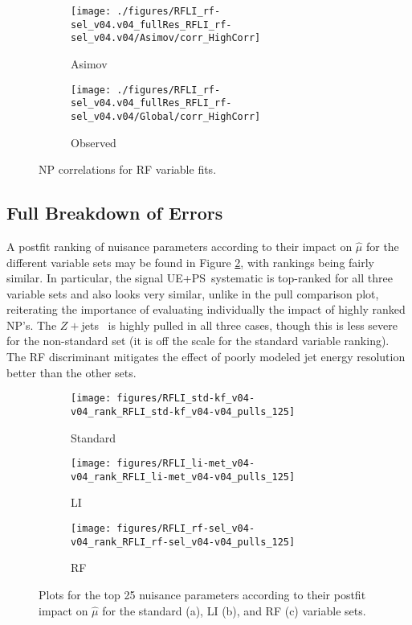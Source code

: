 \begin{figure}[!htbp]\captionsetup{justification=centering}
\begin{subfigure}[t]{0.49000\textwidth}\centering\texttt{[image: ./figures/RFLI\_rf-sel\_v04.v04\_fullRes\_RFLI\_rf-sel\_v04.v04/Asimov/corr\_HighCorr]}\caption{Asimov}\end{subfigure}
\begin{subfigure}[t]{0.49000\textwidth}\centering\texttt{[image: ./figures/RFLI\_rf-sel\_v04.v04\_fullRes\_RFLI\_rf-sel\_v04.v04/Global/corr\_HighCorr]}\caption{Observed}\end{subfigure}
  \caption{NP correlations for RF variable fits.}
  \label{fig:corrrf-sel}
\end{figure}

\subsection{Full Breakdown of Errors}

A postfit ranking of nuisance parameters according to their impact on $\hat{\mu}$ for the different variable sets may be found in Figure \ref{fig:npranking}, with rankings being fairly similar.  In particular, the signal UE+PS \ptv\,systematic is top-ranked for all three variable sets and also looks very similar, unlike in the pull comparison plot, reiterating the importance of evaluating individually the impact of highly ranked NP's.  The $Z+$jets \ptv\, is highly pulled in all three cases, though this is less severe for the non-standard set (it is off the scale for the standard variable ranking).  The RF discriminant mitigates the effect of poorly modeled jet energy resolution better than the other sets.

\begin{figure}[!htbp]\captionsetup{justification=centering}
\begin{subfigure}[t]{0.300000\textwidth}\centering\texttt{[image: figures/RFLI\_std-kf\_v04-v04\_rank\_RFLI\_std-kf\_v04-v04\_pulls\_125]}\caption{Standard}\end{subfigure}
\begin{subfigure}[t]{0.300000\textwidth}\centering\texttt{[image: figures/RFLI\_li-met\_v04-v04\_rank\_RFLI\_li-met\_v04-v04\_pulls\_125]}\caption{LI}\end{subfigure}
\begin{subfigure}[t]{0.300000\textwidth}\centering\texttt{[image: figures/RFLI\_rf-sel\_v04-v04\_rank\_RFLI\_rf-sel\_v04-v04\_pulls\_125]}\caption{RF}\end{subfigure}
  \caption{Plots for the top 25 nuisance parameters according to their postfit impact on $\hat{\mu}$ for the standard (a), LI (b), and RF (c) variable sets.}
  \label{fig:npranking}
\end{figure}

